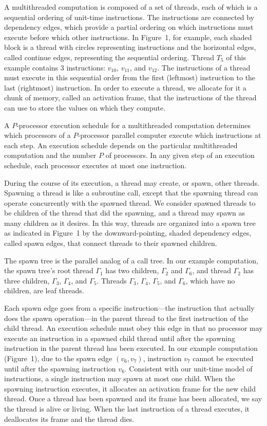 \documentclass{article}
\begin{document}
A multithreaded computation is composed of a set of threads, each of which is a sequential ordering of unit-time instructions. The instructions are connected by dependency edges, which provide a partial ordering on which instructions must execute before which other instructions. In Figure~1, for example, each shaded block is a thread with circles representing instructions and the horizontal edges, called continue edges, representing the sequential ordering. Thread $T_5$ of this example contains 3 instructions: $v_{10}$, $v_{11}$, and $v_{12}$. The instructions of a thread must execute in this sequential order from the first (leftmost) instruction to the last (rightmost) instruction. In order to execute a thread, we allocate for it a chunk of memory, called an activation frame, that the instructions of the thread can use to store the values on which they compute.

A $P$-processor execution schedule for a multithreaded computation determines which processors of a $P$-processor parallel computer execute which instructions at each step. An execution schedule depends on the particular multithreaded computation and the number $P$ of processors. In any given step of an execution schedule, each processor executes at most one instruction.

During the course of its execution, a thread may create, or spawn, other threads. Spawning a thread is like a subroutine call, except that the spawning thread can operate concurrently with the spawned thread. We consider spawned threads to be children of the thread that did the spawning, and a thread may spawn as many children as it desires. In this way, threads are organized into a spawn tree as indicated in Figure~1 by the downward-pointing, shaded dependency edges, called spawn edges, that connect threads to their spawned children.

The spawn tree is the parallel analog of a call tree. In our example computation, the spawn tree's root thread $\Gamma_1$ has two children, $\Gamma_2$ and $\Gamma_6$, and thread $\Gamma_2$ has three children, $\Gamma_3$, $\Gamma_4$, and $\Gamma_5$. Threads $\Gamma_3$, $\Gamma_4$, $\Gamma_5$, and $\Gamma_6$, which have no children, are leaf threads.

Each spawn edge goes from a specific instruction---the instruction that actually does the spawn operation---in the parent thread to the first instruction of the child thread. An execution schedule must obey this edge in that no processor may execute an instruction in a spawned child thread until after the spawning instruction in the parent thread has been executed. In our example computation (Figure~1), due to the spawn edge $(v_6, v_7)$, instruction $v_7$ cannot be executed until after the spawning instruction $v_6$. Consistent with our unit-time model of instructions, a single instruction may spawn at most one child. When the spawning instruction executes, it allocates an activation frame for the new child thread. Once a thread has been spawned and its frame has been allocated, we say the thread is alive or living. When the last instruction of a thread executes, it deallocates its frame and the thread dies.
\end{document}

